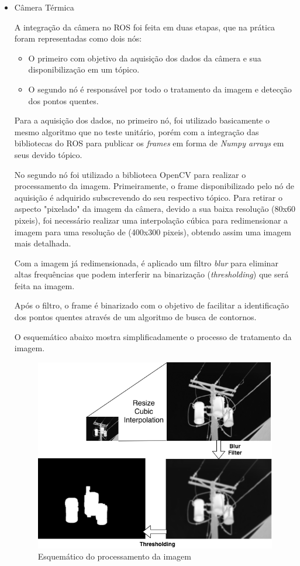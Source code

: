 \begin{itemize}
		\item Câmera Térmica
		
		A integração da câmera no ROS foi feita em duas etapas, que na prática foram representadas como dois nós:
		
		\begin{itemize}
			\item O primeiro com objetivo da aquisição dos dados da câmera e sua disponibilização em um tópico.
			\item O segundo nó é responsável por todo o tratamento da imagem e detecção dos pontos quentes.
		\end{itemize}
		
		Para a aquisição dos dados, no primeiro nó, foi utilizado basicamente o mesmo algoritmo que no teste unitário, porém com a integração das bibliotecas do ROS para publicar os \textit{frames} em forma de \textit{Numpy arrays} em seus devido tópico.
		
		No segundo nó foi utilizado a biblioteca OpenCV para realizar o processamento da imagem. Primeiramente, o frame disponibilizado pelo nó de aquisição é adquirido subscrevendo do seu respectivo tópico. Para retirar o aspecto "pixelado" da imagem da câmera, devido a sua baixa resolução (80x60 pixeis), foi necessário realizar uma interpolação cúbica para redimensionar a imagem para uma resolução de (400x300 pixeis), obtendo assim uma imagem mais detalhada. 
		
		Com a imagem já redimensionada, é aplicado um filtro \textit{blur} para eliminar altas frequências que podem interferir na binarização (\textit{thresholding}) que será feita na imagem.
		
		Após o filtro, o frame é binarizado com o objetivo de facilitar a identificação dos pontos quentes através de um algoritmo de busca de contornos.
		
		O esquemático abaixo mostra simplificadamente o processo de tratamento da imagem.
		
		\begin{figure}[!ht]
			\centering
			\includegraphics[width=14cm]{Figures/image_proc.png}
			\caption{Esquemático do processamento da imagem} \label{imgproc}
		\end{figure}
		

\end{itemize}
